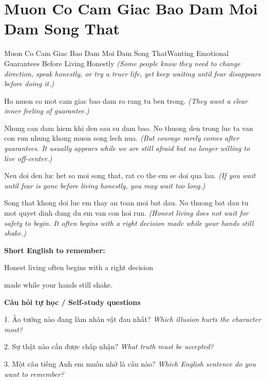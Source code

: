\section{Muon Co Cam Giac Bao Dam Moi Dam Song That}
\begin{truyen}{Muon Co Cam Giac Bao Dam Moi Dam Song That}{Wanting Emotional Guarantees Before Living Honestly}
\textit{(Some people know they need to change direction, speak honestly, or try a truer life, yet keep waiting until fear disappears before doing it.)}

Ho muon co mot cam giac bao dam ro rang tu ben trong.
\textit{(They want a clear inner feeling of guarantee.)}

Nhung can dam hiem khi den sau su dam bao. No thuong den trong luc ta van con run nhung khong muon song lech nua.
\textit{(But courage rarely comes after guarantees. It usually appears while we are still afraid but no longer willing to live off-center.)}

Neu doi den luc het so moi song that, rat co the em se doi qua lau.
\textit{(If you wait until fear is gone before living honestly, you may wait too long.)}

\end{truyen}

\begin{baihoc}
Song that khong doi luc em thay an toan moi bat dau. No thuong bat dau tu mot quyet dinh dung du em van con hoi run.
\textit{(Honest living does not wait for safety to begin. It often begins with a right decision made while your hands still shake.)}
\end{baihoc}

\begin{ghinhoanh}
\textbf{Short English to remember:}

Honest living often begins with a right decision

made while your hands still shake.

\end{ghinhoanh}

\begin{tuhocnhanh}
\textbf{Câu hỏi tự học / Self-study questions}

1. Ảo tưởng nào đang làm nhân vật đau nhất? \textit{Which illusion hurts the character most?}

2. Sự thật nào cần được chấp nhận? \textit{What truth must be accepted?}

3. Một câu tiếng Anh em muốn nhớ là câu nào? \textit{Which English sentence do you want to remember?}
\end{tuhocnhanh}
\ngancach

